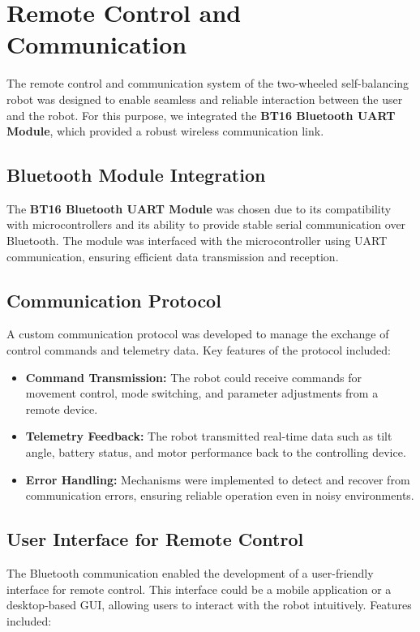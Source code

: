 \section{Remote Control and Communication}

The remote control and communication system of the two-wheeled self-balancing robot was designed to enable seamless and reliable interaction between the user and the robot. For this purpose, we integrated the \textbf{BT16 Bluetooth UART Module}, which provided a robust wireless communication link.

\subsection{Bluetooth Module Integration}
The \textbf{BT16 Bluetooth UART Module} was chosen due to its compatibility with microcontrollers and its ability to provide stable serial communication over Bluetooth. The module was interfaced with the microcontroller using UART communication, ensuring efficient data transmission and reception.

\subsection{Communication Protocol}
A custom communication protocol was developed to manage the exchange of control commands and telemetry data. Key features of the protocol included:

\begin{itemize}
\item \textbf{Command Transmission:} The robot could receive commands for movement control, mode switching, and parameter adjustments from a remote device.
\item \textbf{Telemetry Feedback:} The robot transmitted real-time data such as tilt angle, battery status, and motor performance back to the controlling device.
\item \textbf{Error Handling:} Mechanisms were implemented to detect and recover from communication errors, ensuring reliable operation even in noisy environments.
\end{itemize}

\subsection{User Interface for Remote Control}
The Bluetooth communication enabled the development of a user-friendly interface for remote control. This interface could be a mobile application or a desktop-based GUI, allowing users to interact with the robot intuitively. Features included:

